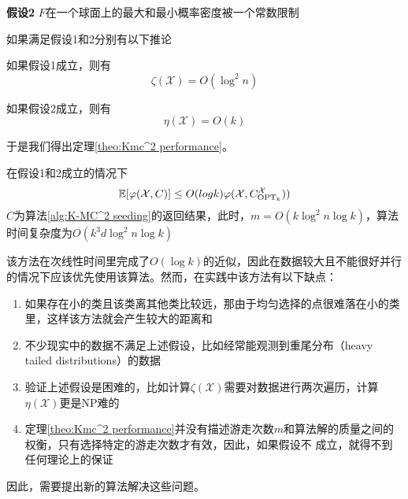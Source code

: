 \textbf{假设2} $F$在一个球面上的最大和最小概率密度被一个常数限制

如果满足假设1和2分别有以下推论
\begin{corollary}
    \label{cor: zeta_x}
    如果假设1成立，则有
    \begin{equation*}
        \zeta(\mathcal{X}) = O(\log^2 n)
    \end{equation*}
\end{corollary}
\begin{corollary}
    \label{cor: eta_x}
    如果假设2成立，则有
    \begin{equation*}
        \eta(\mathcal{X}) = O(k)
    \end{equation*}
\end{corollary}
于是我们得出定理\ref{theo:Kmc^2 performance}。
\begin{theorem}
    \label{theo:Kmc^2 performance}
    在假设1和2成立的情况下
    \begin{equation*}
    \mathbb{E}[\varphi(\mathcal{X},C)]\leq O(logk)\varphi(\mathcal{X},C_{\text{OPT}_k}^{\mathcal{X}}))
    \end{equation*}
    $C$为算法\ref{alg:K-MC^2 seeding}的返回结果，此时，$m = O(k\log^2 n\log k)$，算法时间复杂度为$O(k^3 d \log^2 n \log k)$
\end{theorem}
该方法在次线性时间里完成了$O(\log k)$的近似，因此在数据较大且不能很好并行的情况下应该优先使用该算法。然而，在实践中该方法有以下缺点：
\begin{enumerate}
    \item 如果存在小的类且该类离其他类比较远，那由于均匀选择的点很难落在小的类里，这样该方法就会产生较大的距离和
    \item 不少现实中的数据不满足上述假设，比如经常能观测到重尾分布（heavy tailed distributions）的数据
    \item 验证上述假设是困难的，比如计算$\zeta(\mathcal{X})$需要对数据进行两次遍历，计算$\eta(\mathcal{X})$更是NP难的
    \item 定理\ref{theo:Kmc^2 performance}并没有描述游走次数$m$和算法解的质量之间的权衡，只有选择特定的游走次数才有效，因此，如果假设不
成立，就得不到任何理论上的保证
\end{enumerate}
因此，需要提出新的算法解决这些问题。

